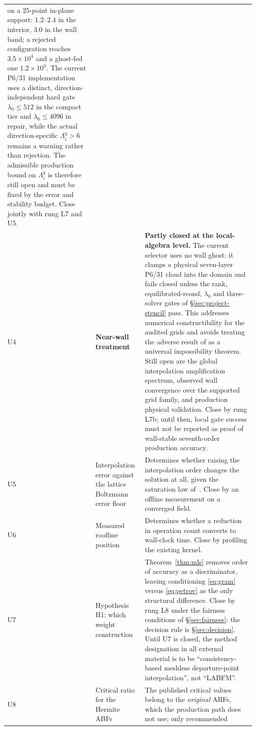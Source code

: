 \documentclass[11pt,a4paper]{article}
\renewcommand{\arraystretch}{1.2}
\newenvironment{widetable}
  {\begingroup\small\setlength{\tabcolsep}{4pt}%
   \renewcommand{\arraystretch}{1.15}%
   \setlength{\LTpre}{0.8em}\setlength{\LTpost}{0.8em}}
  {\endgroup}
\begin{document}
\begin{widetable}
\begin{longtable}{@{}P{0.8cm}P{3.5cm}P{11.4cm}@{}}
on a $25$-point in-plane support: $1.2$--$2.4$ in the interior, $3.0$ in the wall band; a
rejected configuration reaches $3.5\times10^{4}$ and a ghost-fed one
$1.2\times10^{3}$. The current P6/31 implementation uses a distinct,
direction-independent hard gate $\lambda_0\le512$ in the compact tier and
$\lambda_0\le4096$ in repair, while the actual direction-specific
$\Lambda_i^q>6$ remains a warning rather than rejection. The admissible production
bound on $\Lambda_i^q$ is therefore still open and must be fixed by the error and
stability budget. Close jointly with rung L7 and U5. \\
U4 & \textbf{Near-wall treatment} & \textbf{Partly closed at the local-algebra level.}
The current selector uses no wall ghost: it clamps a physical seven-layer P6/31 cloud
into the domain and fails closed unless the rank, equilibrated-rcond, $\lambda_0$ and
three-solver gates of \S\ref{sec:project-stencil} pass. This addresses numerical
constructibility for the audited grids and avoids treating the adverse result of
\cite[\S 7.1]{KL2021} as a universal impossibility theorem. Still open are the global
interpolation amplification spectrum, observed wall convergence over the supported grid
family, and production physical validation. Close by rung L7b; until then, local gate
success must not be reported as proof of wall-stable seventh-order production accuracy. \\
U5 & Interpolation error against the lattice Boltzmann error floor & Determines whether
raising the interpolation order changes the solution at all, given the saturation law
of~\cite{Strzelczyk2023}. Close by an offline measurement on a converged field. \\
U6 & Measured roofline position & Determines whether a reduction in operation count
converts to wall-clock time. Close by profiling the existing kernel. \\
U7 & Hypothesis H1: which weight construction & Theorem~\ref{thm:mls} removes order of
accuracy as a discriminator, leaving conditioning \eqref{eq:gram} versus
\eqref{eq:petrov} as the only structural difference. Close by rung L8 under the
fairness conditions of \S\ref{sec:fairness}; the decision rule is \S\ref{sec:decision}.
Until U7 is closed, the method designation in all external material is to be
``consistency-based meshless departure-point interpolation'', not ``LABFM''. \\
U8 & Critical ratio for the Hermite ABFs & The published critical values belong to the
\emph{original} ABFs, which the production path does not use; only recommended

\end{longtable}
\end{widetable}
\end{document}
